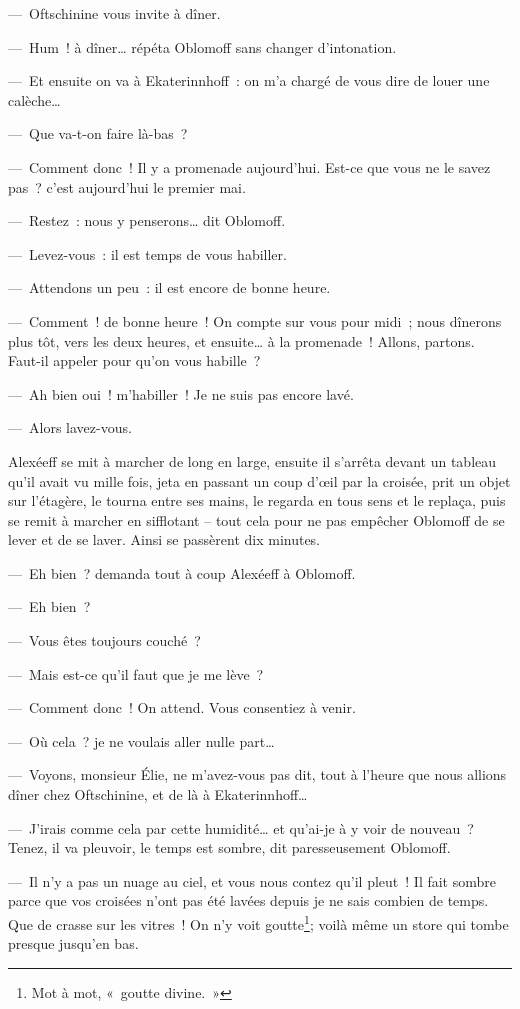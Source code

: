 \documentclass[french,twoside]{book} %
\begin{document}
— Oftschinine vous invite à dîner.\par
— Hum ! à dîner… répéta Oblomoff sans changer d’intonation.\par
— Et ensuite on va à Ekaterinnhoff : on m’a chargé de vous dire de louer une calèche…\par
— Que va-t-on faire là-bas ?\par
— Comment donc ! Il y a promenade aujourd’hui. Est-ce que vous ne le savez pas ? c’est aujourd’hui le premier mai.\par
— Restez : nous y penserons… dit Oblomoff.\par
— Levez-vous : il est temps de vous habiller.\par
— Attendons un peu : il est encore de bonne heure.\par
— Comment ! de bonne heure ! On compte sur vous pour midi ; nous dînerons plus tôt, vers les deux heures, et ensuite… à la promenade ! Allons, partons. Faut-il appeler pour qu’on vous habille ?\par
— Ah bien oui ! m’habiller ! Je ne suis pas encore lavé.\par
— Alors lavez-vous.\par
Alexéeff se mit à marcher de long en large, ensuite il s’arrêta devant un tableau qu’il avait vu mille fois, jeta en passant un coup d’œil par la croisée, prit un objet sur l’étagère, le tourna entre ses mains, le regarda en tous sens et le replaça, puis se remit à marcher en sifflotant – tout cela pour ne pas empêcher Oblomoff de se lever et de se laver. Ainsi se passèrent dix minutes.\par
— Eh bien ? demanda tout à coup Alexéeff à Oblomoff.\par
— Eh bien ?\par
— Vous êtes toujours couché ?\par
— Mais est-ce qu’il faut que je me lève ?\par
— Comment donc ! On attend. Vous consentiez à venir.\par
— Où cela ? je ne voulais aller nulle part…\par
— Voyons, monsieur Élie, ne m’avez-vous pas dit, tout à l’heure que nous allions dîner chez Oftschinine, et de là à Ekaterinnhoff…\par
— J’irais comme cela par cette humidité… et qu’ai-je à y voir de nouveau ? Tenez, il va pleuvoir, le temps est sombre, dit paresseusement Oblomoff.\par
— Il n’y a pas un nuage au ciel, et vous nous contez qu’il pleut ! Il fait sombre parce que vos croisées n’ont pas été lavées depuis je ne sais combien de temps. Que de crasse sur les vitres ! On n’y voit goutte\footnote{Mot à mot, « goutte divine. »}; voilà même un store qui tombe presque jusqu’en bas.\par
\end{document}

